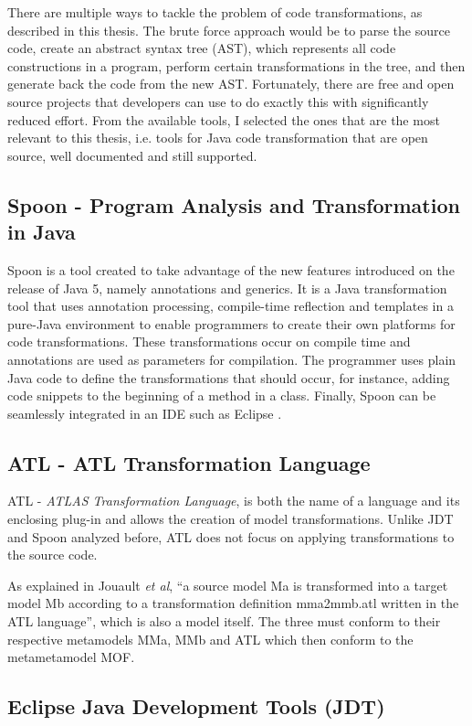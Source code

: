 There are multiple ways to tackle the problem of code transformations, as described in this thesis. The brute force approach would be to parse the source code, create an abstract syntax tree (AST), which represents all code constructions in a program, perform certain transformations in the tree, and then generate back the code from the new AST. Fortunately, there are free and open source projects that developers can use to do exactly this with significantly reduced effort. From the available tools, I selected the ones that are the most relevant to this thesis, i.e. tools for Java code transformation that are open source, well documented and still supported.


\subsection{Spoon - Program Analysis and Transformation in Java}
	Spoon is a tool created to take advantage of the new features introduced on the release of Java 5, namely annotations and generics. It is a Java transformation tool that uses annotation processing, compile-time reflection and templates in a pure-Java environment to enable programmers to create their own platforms for code transformations. These transformations occur on compile time and annotations are used as parameters for compilation. The programmer uses plain Java code to define the transformations that should occur, for instance, adding code snippets to the beginning of a method in a class. Finally, Spoon can be seamlessly integrated in an IDE such as Eclipse \cite{pawlak2006spoon}.


\subsection{ATL - ATL Transformation Language }
	ATL - \emph{ATLAS Transformation Language}, is both the name of a language and its enclosing plug-in and allows the creation of model transformations. Unlike JDT and Spoon analyzed before, ATL does not focus on applying transformations to the source code.

	As explained in Jouault \emph{et al}, ``a source model Ma is transformed into a target model Mb according to a transformation definition mma2mmb.atl written in the ATL language'', which is also a model itself. The three must conform to their respective metamodels MMa, MMb and ATL which then conform to the metametamodel MOF.

\subsection{Eclipse Java Development Tools (JDT)}

